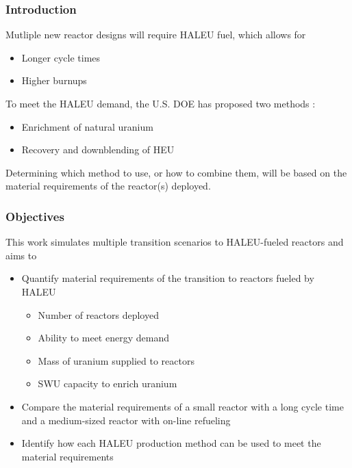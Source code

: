 \begin{frame}
    \frametitle{Introduction}
    Mutliple new reactor designs will require \gls{HALEU} fuel, which allows for 
    \begin{itemize}
        \item Longer cycle times
        \item Higher burnups 
    \end{itemize}
    To meet the \gls{HALEU} demand, the U.S. \gls{DOE} has proposed two methods
    \cite{griffith_overview_2020}:
    \begin{itemize}
        \item Enrichment of natural uranium
        \item Recovery and downblending of \gls{HEU}
    \end{itemize}
    Determining which method to use, or how to combine them, will be based on 
    the material requirements of the reactor(s) deployed.

\end{frame}

\begin{frame}
    \frametitle{Objectives}
    This work simulates multiple transition scenarios to \gls{HALEU}-fueled 
    reactors and aims to 
    \begin{itemize}
        \item Quantify material requirements of the transition to reactors 
              fueled by \gls{HALEU}
              \begin{itemize}
                  \item Number of reactors deployed 
                  \item Ability to meet energy demand
                  \item Mass of uranium supplied to reactors
                  \item \gls{SWU} capacity to enrich uranium
              \end{itemize}
        \item Compare the material requirements of a small reactor with a long cycle 
              time and a medium-sized reactor with on-line refueling
        \item Identify how each \gls{HALEU} production method can be used to 
              meet the material requirements
    \end{itemize}
\end{frame}